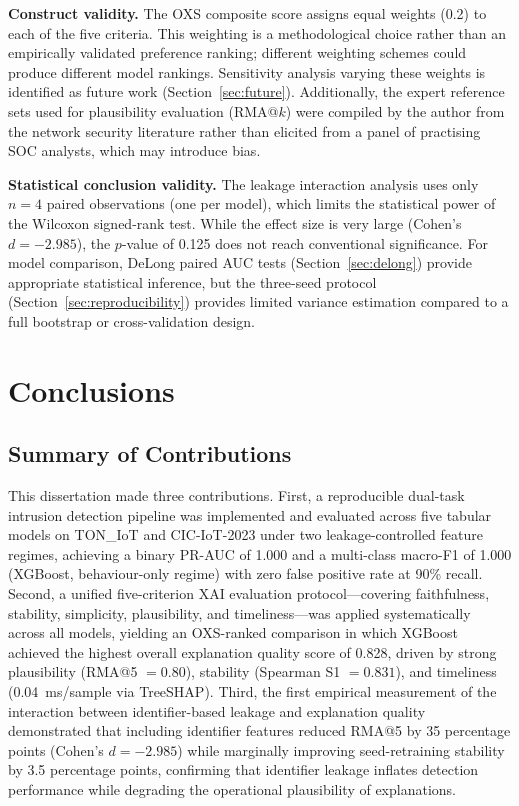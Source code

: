 \documentclass[12pt,a4paper]{report}
\begin{document}
\textbf{Construct validity.} The OXS composite score assigns equal weights (0.2) to each of the five criteria. This weighting is a methodological choice rather than an empirically validated preference ranking; different weighting schemes could produce different model rankings. Sensitivity analysis varying these weights is identified as future work (Section~\ref{sec:future}). Additionally, the expert reference sets used for plausibility evaluation (RMA@$k$) were compiled by the author from the network security literature rather than elicited from a panel of practising SOC analysts, which may introduce bias.

\textbf{Statistical conclusion validity.} The leakage interaction analysis uses only $n = 4$ paired observations (one per model), which limits the statistical power of the Wilcoxon signed-rank test. While the effect size is very large (Cohen's $d = -2.985$), the $p$-value of 0.125 does not reach conventional significance. For model comparison, DeLong paired AUC tests (Section~\ref{sec:delong}) provide appropriate statistical inference, but the three-seed protocol (Section~\ref{sec:reproducibility}) provides limited variance estimation compared to a full bootstrap or cross-validation design.

\chapter{Conclusions}
\label{ch:conclusions}

\section{Summary of Contributions}
\label{sec:conclusion-contributions}

This dissertation made three contributions. First, a reproducible dual-task intrusion detection pipeline was implemented and evaluated across five tabular models on TON\_IoT and CIC-IoT-2023 under two leakage-controlled feature regimes, achieving a binary PR-AUC of 1.000 and a multi-class macro-F1 of 1.000 (XGBoost, behaviour-only regime) with zero false positive rate at 90\% recall. Second, a unified five-criterion XAI evaluation protocol---covering faithfulness, stability, simplicity, plausibility, and timeliness---was applied systematically across all models, yielding an OXS-ranked comparison in which XGBoost achieved the highest overall explanation quality score of 0.828, driven by strong plausibility (RMA@5 $= 0.80$), stability (Spearman S1 $= 0.831$), and timeliness (0.04~ms/sample via TreeSHAP). Third, the first empirical measurement of the interaction between identifier-based leakage and explanation quality demonstrated that including identifier features reduced RMA@5 by 35 percentage points (Cohen's $d = -2.985$) while marginally improving seed-retraining stability by 3.5 percentage points, confirming that identifier leakage inflates detection performance while degrading the operational plausibility of explanations.
\end{document}
